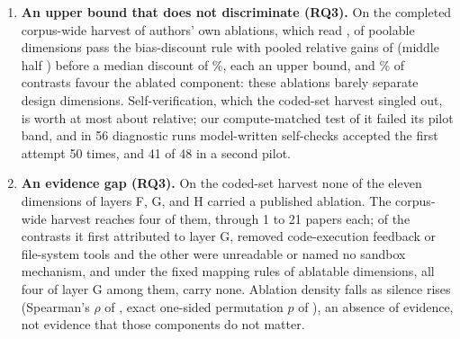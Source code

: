 \begin{enumerate}
  \item \textbf{An upper bound that does not discriminate (RQ3).} On the completed corpus-wide harvest of
  authors' own ablations, which read \rqHarvestTierCoverage, \rqDiscountSurviveZ{} of
  \rqPoolableDims{} poolable dimensions pass the bias-discount rule with pooled relative gains of
  \rqEffectRangeSurviving{} (middle half \rqEffectIQRSurviving) before a median discount of \rqMedianDiscountPct\%, each an upper bound,
  and \rqSignSharePct\% of contrasts favour the ablated component: these ablations barely separate design
  dimensions. Self-verification, which the coded-set harvest singled out, is worth at most about
  \rqSVDiscounted{} relative; our compute-matched test of it failed its pilot band, and in 56
  diagnostic runs model-written self-checks accepted the first attempt 50 times, and 41 of 48 in a
  second pilot.

  \item \textbf{An evidence gap (RQ3).} On the coded-set harvest none of the eleven dimensions of
  layers F, G, and H carried a published ablation. The corpus-wide harvest reaches four of them,
  through 1 to 21 papers each; of the \rqPreRuleGContrasts{} contrasts it first attributed to layer G,
  \rqPreRuleGRemapped{} removed code-execution feedback or file-system tools and the other
  \rqPreRuleGDropped{} were unreadable or named no sandbox mechanism, and under the fixed mapping rules \rqZeroDimCount{} of
  \rqAblatableDimCount{} ablatable dimensions, all four of layer G among them, carry none. Ablation
  density falls as silence rises (Spearman's $\rho$ of \rqCoverageRho, exact one-sided permutation $p$
  of \rqCoverageP), an absence of evidence, not evidence that those components do not matter.
\end{enumerate}
